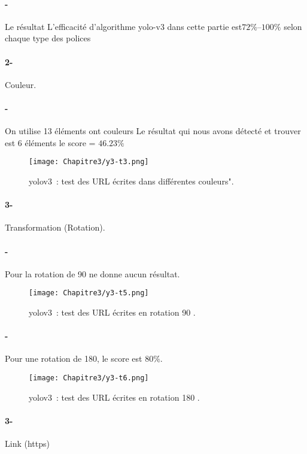         \paragraph{-}Le résultat 
         L’efficacité d’algorithme yolo-v3 dans cette partie est$72\%$--$100\%$ selon chaque type des polices


      \paragraph{2-} Couleur.
      \paragraph{-}  On utilise 13 éléments ont couleurs
      Le résultat qui nous avons détecté et trouver est 6 éléments le score = $46.23\%$
      \begin{figure}[H]
          \centering
           \texttt{[image: Chapitre3/y3-t3.png]}
           \caption{yolov3 : test des URL écrites dans différentes couleurs".}
           \label{y3_t3}
           \end{figure}
     
      \paragraph{3-} Transformation (Rotation).
      \paragraph{-} Pour la rotation de 90 ne donne aucun résultat.
      \begin{figure}[H]
          \centering
           \texttt{[image: Chapitre3/y3-t5.png]}
           \caption{yolov3 : test des URL écrites en rotation 90  .}
           \label{y3_t5}
           \end{figure}
     
      \paragraph{-} Pour une rotation de 180, le score est $80\%$.
      \begin{figure}[H]
          \centering
           \texttt{[image: Chapitre3/y3-t6.png]}
           \caption{yolov3 : test des URL écrites en rotation 180 .}
           \label{y3_t6}
           \end{figure}

      \paragraph{3-}Link (https)
